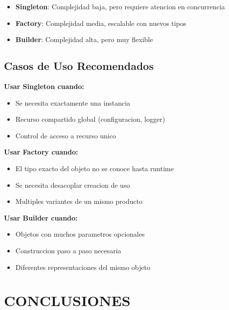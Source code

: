 \documentclass[11pt,a4paper]{article}
\begin{document}
\begin{itemize}
    \item \textbf{Singleton}: Complejidad baja, pero requiere atencion en concurrencia
    \item \textbf{Factory}: Complejidad media, escalable con nuevos tipos
    \item \textbf{Builder}: Complejidad alta, pero muy flexible
\end{itemize}

\subsection{Casos de Uso Recomendados}

\textbf{Usar Singleton cuando:}
\begin{itemize}
    \item Se necesita exactamente una instancia
    \item Recurso compartido global (configuracion, logger)
    \item Control de acceso a recurso unico
\end{itemize}

\textbf{Usar Factory cuando:}
\begin{itemize}
    \item El tipo exacto del objeto no se conoce hasta runtime
    \item Se necesita desacoplar creacion de uso
    \item Multiples variantes de un mismo producto
\end{itemize}

\textbf{Usar Builder cuando:}
\begin{itemize}
    \item Objetos con muchos parametros opcionales
    \item Construccion paso a paso necesaria
    \item Diferentes representaciones del mismo objeto
\end{itemize}

\section{CONCLUSIONES}
\end{document}
